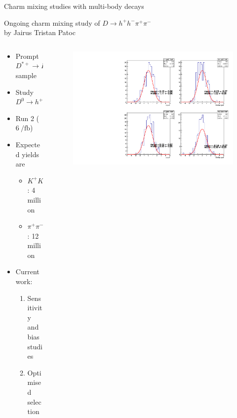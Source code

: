 \documentclass[xcolor={dvipsnames}]{beamer}
\begin{document}
\begin{frame}{Charm mixing studies with multi-body decays}
  \begin{center}
    \Large Ongoing charm mixing study of $D\to h^+h^-\pi^+\pi^-$\\
    \normalsize by Jairus Tristan Patoc
  \end{center}
  \vspace{-0.2cm}
  \begin{columns}
    \begin{column}{0.5\textwidth}
      \vspace{-0.3cm}
      \begin{itemize}
        \setlength\itemsep{1.0em}
        \item{Prompt $D^{*+}\to D^0\pi^+$ sample}
        \item{Study $D^0\to h^+h^-\pi^+\pi^-$}
        \item{Run 2 ($\SI{6}{\per\femto\barn}$)}
        \item{Expected yields are}
        \begin{itemize}
          \item{$K^+K^-\pi^+\pi^-$: 4 million}
          \item{$\pi^+\pi^-\pi^+\pi^-$: 12 million}
        \end{itemize}
        \item{Current work:}
        \begin{enumerate}
          \item{Sensitivity and bias studies}
          \item{Optimised selection}
        \end{enumerate}
      \end{itemize}
    \end{column}
    \begin{column}{0.5\textwidth}
      \begin{figure}[htb]
        \centering
        \includegraphics[width=1.0\textwidth]{Plots/PSbinned_pulls_CPtoy.pdf}
      \end{figure}
    \end{column}
  \end{columns}
\end{frame}
\end{document}

